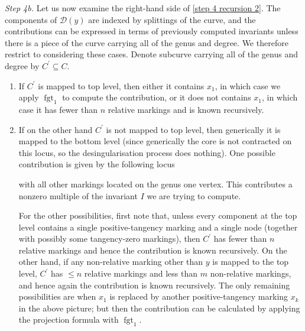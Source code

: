 \documentclass[11pt]{amsart}
\newcommand{\fgt}{\operatorname{fgt}}
\newcommand{\Dcal}{\mathcal{D}}
\theoremstyle{definition}
\theoremstyle{definition}
\begin{document}
\noindent \emph{Step 4b.} Let us now examine the right-hand side of \eqref{step 4 recursion 2}. The components of $\Dcal(y)$ are indexed by splittings of the curve, and the contributions can be expressed in terms of previously computed invariants unless there is a piece of the curve carrying all of the genus and degree. We therefore restrict to considering these cases. Denote subcurve carrying all of the genus and degree by $C^\prime\subseteq C$.
\begin{enumerate}
\item If $C^\prime$ is mapped to top level, then either it contains $x_1$, in which case we apply $\fgt_1$ to compute the contribution, or it does not contains $x_1$, in which case it has fewer than $n$ relative markings and is known recursively. 
\item  If on the other hand $C^\prime$ is not mapped to top level, then generically it is mapped to the bottom level (since generically the core is not contracted on this locus, so the desingularisation process does nothing). One possible contribution is given by the following locus
\begin{center}
\end{center}
with all other markings located on the genus one vertex. This contributes a nonzero multiple of the invariant $I$ we are trying to compute.

For the other possibilities, first note that, unless every component at the top level contains a single positive-tangency marking and a single node (together with possibly some tangency-zero markings), then $C^\prime$ has fewer than $n$ relative markings and hence the contribution is known recursively. On the other hand, if any non-relative marking other than $y$ is mapped to the top level, $C^\prime$ has $\leq n$ relative markings and less than $m$ non-relative markings, and hence again the contribution is known recursively. The only remaining possibilities are when $x_1$ is replaced by another positive-tangency marking $x_k$ in the above picture; but then the contribution can be calculated by applying the projection formula with $\fgt_{1}$.
\end{enumerate}
\end{document}
